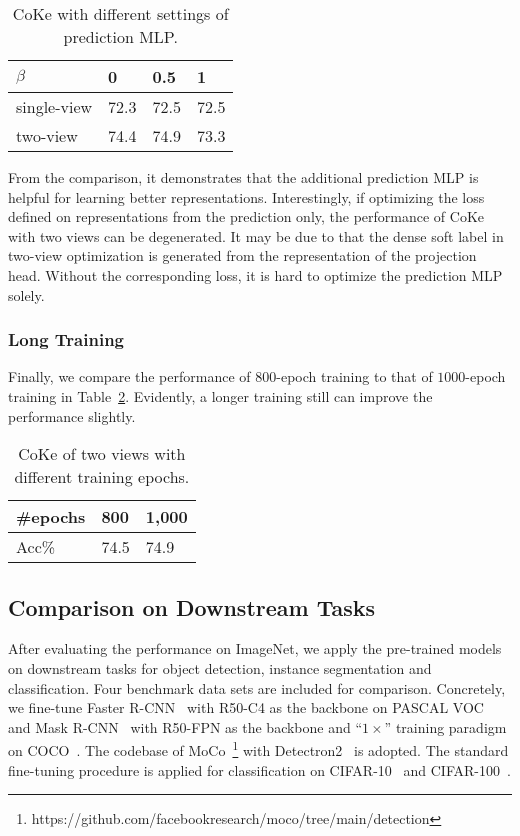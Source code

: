 \documentclass[10pt,twocolumn,letterpaper]{article}
\begin{document}
\begin{table}[!ht]
\centering
\begin{tabular}{|l|l|l|l|}\hline
$\beta$&0&0.5&1\\\hline
single-view &72.3 & 72.5&72.5\\\hline
two-view&74.4&74.9&73.3\\\hline
\end{tabular}
\caption{CoKe with different settings of prediction MLP.}\label{tas:beta}
\end{table}

From the comparison, it demonstrates that the additional prediction MLP is helpful for learning better representations. Interestingly, if optimizing the loss defined on representations from the prediction only, the performance of CoKe with two views can be degenerated. It may be due to that the dense soft label in two-view optimization is generated from the representation of the projection head. Without the corresponding loss, it is hard to optimize the prediction MLP solely.

\subsubsection{Long Training}
Finally, we compare the performance of $800$-epoch training to that of $1000$-epoch training in Table~\ref{tas:long}. Evidently, a longer training still can improve the performance slightly.

\begin{table}[!ht]
\centering
\begin{tabular}{|l|l|l|}\hline
\#epochs&800&1,000\\\hline
Acc\% &74.5&74.9\\\hline
\end{tabular}
\caption{CoKe of two views with different training epochs.}\label{tas:long}
\end{table}

\subsection{Comparison on Downstream Tasks}

After evaluating the performance on ImageNet, we apply the pre-trained models on downstream tasks for object detection, instance segmentation and classification. Four benchmark data sets are included for comparison. Concretely, we fine-tune Faster R-CNN~\cite{RenHG017} with R50-C4 as the backbone on PASCAL VOC~\cite{EveringhamGWWZ10} and Mask R-CNN~\cite{HeGDG17} with R50-FPN as the backbone and ``$1\times$'' training paradigm on COCO~\cite{LinMBHPRDZ14}. The codebase of MoCo~\footnote{https://github.com/facebookresearch/moco/tree/main/detection} with Detectron2~\cite{wu2019detectron2} is adopted. The standard fine-tuning procedure is applied for classification on CIFAR-10~\cite{krizhevsky2009learning} and CIFAR-100~\cite{krizhevsky2009learning}.
\end{document}
